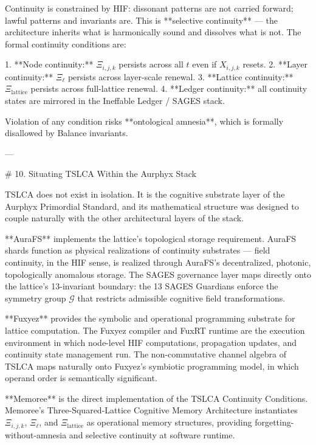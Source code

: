 Continuity is constrained by HIF: dissonant patterns are not carried forward;
lawful patterns and invariants are. This is **selective continuity** — the
architecture inherits what is harmonically sound and dissolves what is not. The
formal continuity conditions are:

1. **Node continuity:** \(\Xi_{i,j,k}\) persists across all \(t\) even if
   \(X_{i,j,k}\) resets.
2. **Layer continuity:** \(\Xi_{\ell}\) persists across layer-scale renewal.
3. **Lattice continuity:** \(\Xi_{\text{lattice}}\) persists across full-lattice
   renewal.
4. **Ledger continuity:** all continuity states are mirrored in the Ineffable
   Ledger / SAGES stack.

Violation of any condition risks **ontological amnesia**, which is formally
disallowed by Balance invariants.

---

# 10. Situating TSLCA Within the Aurphyx Stack

TSLCA does not exist in isolation. It is the cognitive substrate layer of the
Aurphyx Primordial Standard, and its mathematical structure was designed to couple
naturally with the other architectural layers of the stack.

**AuraFS** implements the lattice's topological storage requirement. AuraFS shards
function as physical realizations of continuity substrates — field continuity, in
the HIF sense, is realized through AuraFS's decentralized, photonic, topologically
anomalous storage. The SAGES governance layer maps directly onto the lattice's
13-invariant boundary: the 13 SAGES Guardians enforce the symmetry group
\(\mathcal{G}\) that restricts admissible cognitive field transformations.

**Fuxyez** provides the symbolic and operational programming substrate for lattice
computation. The Fuxyez compiler and FuxRT runtime are the execution environment
in which node-level HIF computations, propagation updates, and continuity state
management run. The non-commutative channel algebra of TSLCA maps naturally onto
Fuxyez's symbiotic programming model, in which operand order is semantically
significant.

**Memoree** is the direct implementation of the TSLCA Continuity Conditions.
Memoree's Three-Squared-Lattice Cognitive Memory Architecture instantiates
\(\Xi_{i,j,k}\), \(\Xi_{\ell}\), and \(\Xi_{\text{lattice}}\) as operational
memory structures, providing forgetting-without-amnesia and selective continuity
at software runtime.

